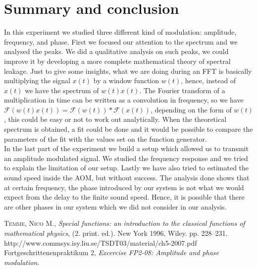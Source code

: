 \documentclass[a4paper,10pt]{article}
\begin{document}
\section{Summary and conclusion}
In this experiment we studied three different kind of modulation: amplitude, frequency, and phase. First we focused our attention to the spectrum and we analysed the peaks. We did a qualitative analysis on such peaks, we could improve it by developing a more complete mathematical theory of spectral leakage. Just to give some insights, what we are doing during an FFT is basically multiplying the signal $x(t)$ by a window function $w(t)$, hence, instead of $x(t)$ we have the spectrum of $w(t)x(t)$. The Fourier transform of a multiplication in time can be written as a convolution in frequency, so we have $\mathcal{F}(w(t)x(t)) = \mathcal{F}(w(t))*\mathcal{F}(x(t))$, depending on the form of $w(t)$, this could be easy or not to work out analytically. When the theoretical spectrum is obtained, a fit could be done and it would be possible to compare the parameters of the fit with the values set on the function generator.\\
In the last part of the experiment we build a setup which allowed us to transmit an amplitude modulated signal. We studied the frequency response and we tried to explain the limitation of our setup. Lastly we have also tried to estimated the sound speed inside the AOM, but without success. The analysis done shows that at certain frequency, the phase introduced by our system is not what we would expect from the delay to the finite sound speed. Hence, it is possible that there are other phases in our system which we did not consider in our analysis.

\begin{thebibliography}{99}
\textsc{Temme, Nico M.}, \textit{Special functions: an introduction to the classical functions of mathematical physics}, (2. print. ed.). New York 1996, Wiley. pp. 228–231. 
 http://www.commsys.isy.liu.se/TSDT03/material/ch5-2007.pdf
Fortgeschrittenenpraktikum 2, \textit{Excercise FP2-08: Amplitude and phase modulation}.
\end{thebibliography}
\end{document}
